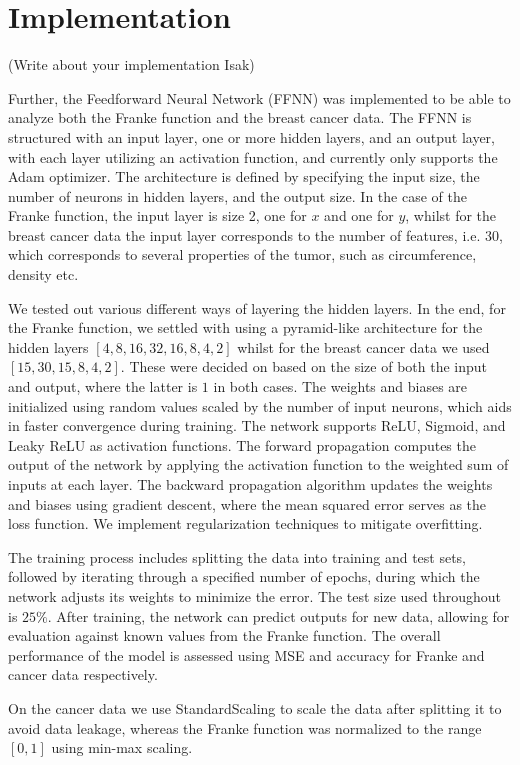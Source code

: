 \documentclass[%
reprint,
amsmath,amssymb,
aps,
]{revtex4-2}
\begin{document}
\section{Implementation}
(Write about your implementation Isak)

Further, the Feedforward Neural Network (FFNN) was implemented to be able to analyze both the Franke function and the breast cancer data. The FFNN is structured with an input layer, one or more hidden layers, and an output layer, with each layer utilizing an activation function, and currently only supports the Adam optimizer. The architecture is defined by specifying the input size, the number of neurons in hidden layers, and the output size. In the case of the Franke function, the input layer is size 2, one for $x$ and one for $y$, whilst for the breast cancer data the input layer corresponds to the number of features, i.e. $30$, which corresponds to several properties of the tumor, such as circumference, density etc. 

We tested out various different ways of layering the hidden layers. In the end, for the Franke function, we settled with using a pyramid-like architecture for the hidden layers $[4,8,16,32,16,8,4,2]$ whilst for the breast cancer data we used $[15,30,15,8,4,2]$. These were decided on based on the size of both the input and output, where the latter is $1$ in both cases. The weights and biases are initialized using random values scaled by the number of input neurons, which aids in faster convergence during training. The network supports ReLU, Sigmoid, and Leaky ReLU as activation functions. The forward propagation computes the output of the network by applying the activation function to the weighted sum of inputs at each layer. The backward propagation algorithm updates the weights and biases using gradient descent, where the mean squared error serves as the loss function. We implement regularization techniques to mitigate overfitting.

The training process includes splitting the data into training and test sets, followed by iterating through a specified number of epochs, during which the network adjusts its weights to minimize the error. The test size used throughout is $25\%$. After training, the network can predict outputs for new data, allowing for evaluation against known values from the Franke function. The overall performance of the model is assessed using MSE and accuracy for Franke and cancer data respectively.

On the cancer data we use StandardScaling to scale the data after splitting it to avoid data leakage, whereas the Franke function was normalized to the range $[0,1]$ using min-max scaling.
\end{document}
